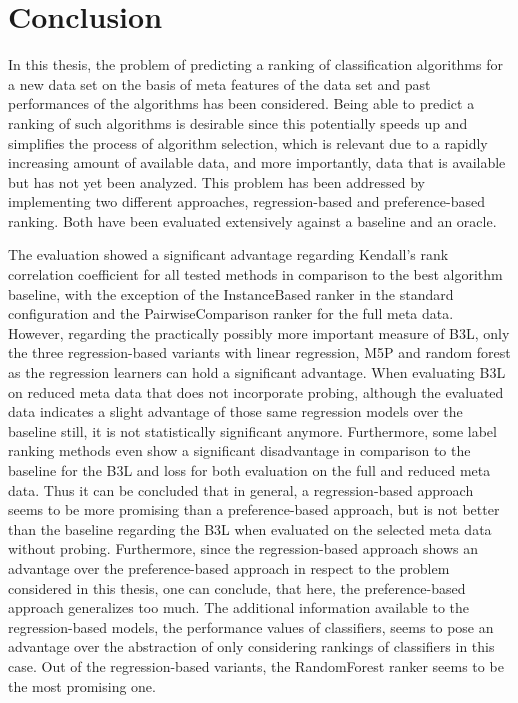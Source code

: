 \chapter{Conclusion}
\label{sec:conclusion}
In this thesis, the problem of predicting a ranking of classification algorithms for a new data set on the basis of meta features of the data set and past performances of the algorithms has been considered. Being able to predict a ranking of such algorithms is desirable since this potentially speeds up and simplifies the process of algorithm selection, which is relevant due to a rapidly increasing amount of available data, and more importantly, data that is available but has not yet been analyzed. This problem has been addressed by implementing two different approaches, regression-based and preference-based ranking. Both have been evaluated extensively against a baseline and an oracle.

The evaluation showed a significant advantage regarding Kendall's rank correlation coefficient for all tested methods in comparison to the best algorithm baseline, with the exception of the InstanceBased ranker in the standard configuration and the PairwiseComparison ranker for the full meta data. However, regarding the practically possibly more important measure of B3L, only the three regression-based variants with linear regression, M5P and random forest as the regression learners can hold a significant advantage. When evaluating B3L on reduced meta data that does not incorporate probing, although the evaluated data indicates a slight advantage of those same regression models over the baseline still, it is not statistically significant anymore. Furthermore, some label ranking methods even show a significant disadvantage in comparison to the baseline for the B3L and loss for both evaluation on the full and reduced meta data. Thus it can be concluded that in general, a regression-based approach seems to be more promising than a preference-based approach, but is not better than the baseline regarding the B3L when evaluated on the selected meta data without probing. Furthermore, since the regression-based approach shows an advantage over the preference-based approach in respect to the problem considered in this thesis, one can conclude, that here, the preference-based approach generalizes too much. The additional information available to the regression-based models, the performance values of classifiers, seems to pose an advantage over the abstraction of only considering rankings of classifiers in this case. Out of the regression-based variants, the RandomForest ranker seems to be the most promising one.

